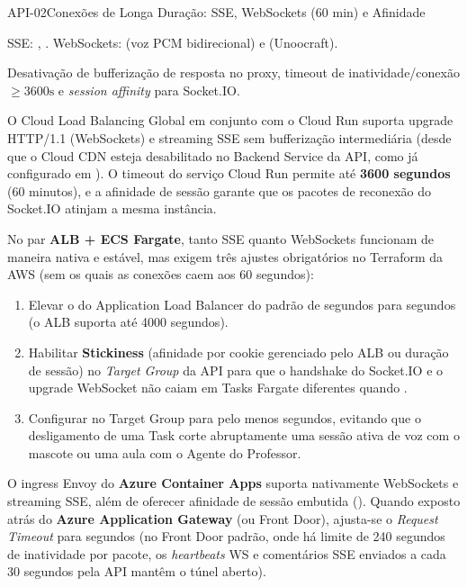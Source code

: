 \begin{pecaarq}{API-02}{Conexões de Longa Duração: SSE, WebSockets (60 min) e Afinidade}{\sgcp~\nativo\enspace\saws~\equivalente\enspace\sazure~\nativo}
\begin{campos}
  \item[Rotas críticas] SSE: , . WebSockets:  (voz PCM bidirecional) e  (Unoocraft).
  \item[Requisitos de rede] Desativação de bufferização de resposta no proxy, timeout de inatividade/conexão $\ge 3600\text{s}$ e \emph{session affinity} para Socket.IO.
  \item[Como é hoje (GCP)] O Cloud Load Balancing Global em conjunto com o Cloud Run suporta upgrade HTTP/1.1  (WebSockets) e streaming SSE sem bufferização intermediária (desde que o Cloud CDN esteja desabilitado no Backend Service da API, como já configurado em ). O timeout do serviço Cloud Run permite até \textbf{3600 segundos} (60 minutos), e a afinidade de sessão garante que os pacotes de reconexão do Socket.IO atinjam a mesma instância.
  \item[Equivalente AWS] No par \textbf{ALB + ECS Fargate}, tanto SSE quanto WebSockets funcionam de maneira nativa e estável, mas exigem três ajustes obrigatórios no Terraform da AWS (sem os quais as conexões caem aos 60 segundos):
  \begin{enumerate}
    \item Elevar o  do Application Load Balancer do padrão de  segundos para \textbf{} segundos (o ALB suporta até 4000 segundos).
    \item Habilitar \textbf{Stickiness} (afinidade por cookie gerenciado pelo ALB ou duração de sessão) no \emph{Target Group} da API para que o handshake do Socket.IO e o upgrade WebSocket não caiam em Tasks Fargate diferentes quando .
    \item Configurar  no Target Group para pelo menos  segundos, evitando que o desligamento de uma Task corte abruptamente uma sessão ativa de voz com o mascote ou uma aula com o Agente do Professor.
  \end{enumerate}
  \item[Equivalente Azure] O ingress Envoy do \textbf{Azure Container Apps} suporta nativamente WebSockets e streaming SSE, além de oferecer afinidade de sessão embutida (). Quando exposto atrás do \textbf{Azure Application Gateway} (ou Front Door), ajusta-se o \emph{Request Timeout} para  segundos (no Front Door padrão, onde há limite de 240 segundos de inatividade por pacote, os \emph{heartbeats} WS e comentários SSE  enviados a cada 30 segundos pela API mantêm o túnel aberto).
\end{campos}
\end{pecaarq}

